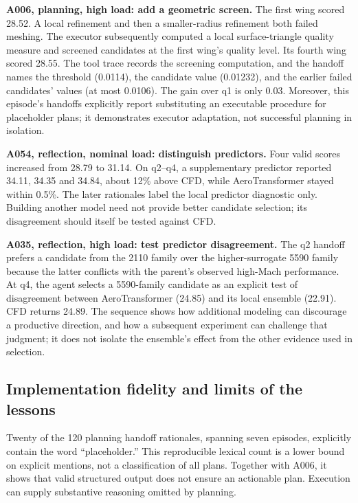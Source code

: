 \textbf{A006, planning, high load: add a geometric screen.} The first wing
scored 28.52. A local refinement and then a smaller-radius refinement both
failed meshing. The executor subsequently computed a local surface-triangle
quality measure and screened candidates at the first wing's quality level.
Its fourth wing scored 28.55. The tool trace records the screening computation,
and the handoff names the threshold (0.0114), the candidate value (0.01232),
and the earlier failed candidates' values (at most 0.0106). The gain over q1
is only 0.03. Moreover, this episode's handoffs explicitly report substituting
an executable procedure for placeholder plans; it demonstrates executor
adaptation, not successful planning in isolation.

\textbf{A054, reflection, nominal load: distinguish predictors.} Four valid
scores increased from 28.79 to 31.14. On q2--q4, a supplementary predictor
reported 34.11, 34.35 and 34.84, about 12\% above CFD, while AeroTransformer
stayed within 0.5\%. The later rationales label the local predictor diagnostic
only. Building another model need not provide better candidate selection;
its disagreement should itself be tested against CFD.

\textbf{A035, reflection, high load: test predictor disagreement.} The q2
handoff prefers a candidate from the 2110 family over the higher-surrogate
5590 family because the latter conflicts with the parent's observed
high-Mach performance. At q4, the agent selects a 5590-family candidate as
an explicit test of disagreement between AeroTransformer (24.85) and its
local ensemble (22.91). CFD returns 24.89. The sequence shows how additional
modeling can discourage a productive direction, and how a subsequent
experiment can challenge that judgment; it does not isolate the ensemble's
effect from the other evidence used in selection.

\subsection{Implementation fidelity and limits of the lessons}

Twenty of the 120 planning handoff rationales, spanning seven episodes,
explicitly contain the word ``placeholder.'' This reproducible lexical count
is a lower bound on explicit mentions, not a classification of all plans.
Together with A006, it shows that valid structured output does not ensure an
actionable plan. Execution can supply substantive reasoning omitted by planning.

